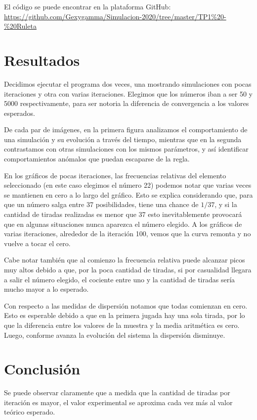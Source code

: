 \documentclass{article}
\begin{document}
El código se puede encontrar en la plataforma GitHub: 
\url{https://github.com/Gexygamma/Simulacion-2020/tree/master/TP1%20-%20Ruleta}

\section{Resultados}

Decidimos ejecutar el programa dos veces, una mostrando simulaciones con pocas iteraciones y otra con varias iteraciones. Elegimos que los números iban a ser 50 y 5000 respectivamente, para ser notoria la diferencia de convergencia a los valores esperados. 

De cada par de imágenes, en la primera figura analizamos el comportamiento de una simulación y su evolución a través del tiempo, mientras que en la segunda contrastamos con otras simulaciones con los mismos parámetros, y así identificar comportamientos anómalos que puedan escaparse de la regla.

En los gráficos de pocas iteraciones, las frecuencias relativas del elemento seleccionado (en este caso elegimos el número 22) podemos notar que varias veces se mantienen en cero a lo largo del gráfico. Esto se explica considerando que, para que un número salga entre 37 posibilidades, tiene una chance de $1/37$, y si la cantidad de tiradas realizadas es menor que 37 esto inevitablemente provocará que en algunas situaciones nunca aparezca el número elegido. A los gráficos de varias iteraciones, alrededor de la iteración 100, vemos que la curva remonta y no vuelve a tocar el cero.

Cabe notar también que al comienzo la frecuencia relativa puede alcanzar picos muy altos debido a que, por la poca cantidad de tiradas, si por casualidad llegara a salir el número elegido, el cociente entre uno y la cantidad de tiradas sería mucho mayor a lo esperado.

Con respecto a las medidas de dispersión notamos que todas comienzan en cero. Esto es esperable debido a que en la primera jugada hay una sola tirada, por lo que la diferencia entre los valores de la muestra y la media aritmética es cero. Luego, conforme avanza la evolución del sistema la dispersión disminuye.

\section{Conclusión}

Se puede observar claramente que a medida que la cantidad de tiradas por iteración es mayor, el valor experimental se aproxima cada vez más al valor teórico esperado. 
\end{document}
